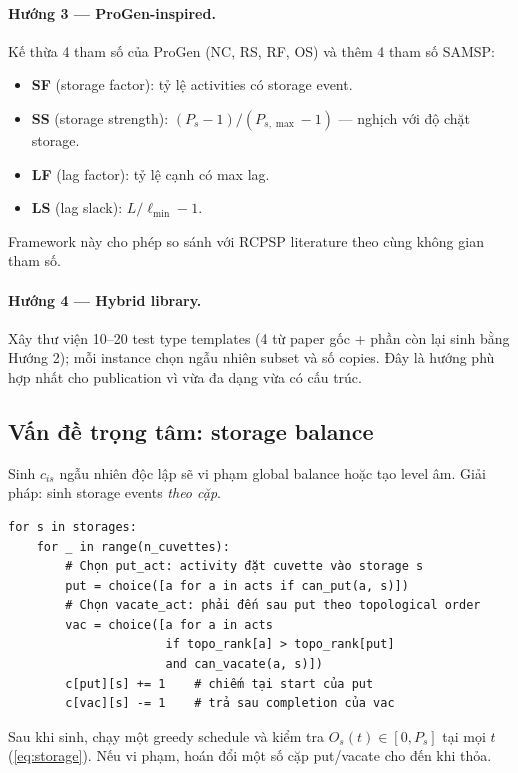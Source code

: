 \documentclass[11pt,a4paper]{article}
\theoremstyle{remark}
\begin{document}
\paragraph{Hướng 3 — ProGen-inspired.}
Kế thừa 4 tham số của ProGen (NC, RS, RF, OS) và thêm 4 tham số SAMSP:
\begin{itemize}[noitemsep]
  \item \textbf{SF} (storage factor): tỷ lệ activities có storage event.
  \item \textbf{SS} (storage strength): $(P_s - 1) / (P_{s,\max} - 1)$
    — nghịch với độ chặt storage.
  \item \textbf{LF} (lag factor): tỷ lệ cạnh có max lag.
  \item \textbf{LS} (lag slack): $L / \ell_{\min} - 1$.
\end{itemize}
Framework này cho phép so sánh với RCPSP literature theo cùng không gian tham số.

\paragraph{Hướng 4 — Hybrid library.}
Xây thư viện 10--20 test type templates (4 từ paper gốc + phần còn lại
sinh bằng Hướng 2); mỗi instance chọn ngẫu nhiên subset và số copies.
Đây là hướng phù hợp nhất cho publication vì vừa đa dạng vừa có cấu trúc.

\subsection{Vấn đề trọng tâm: storage balance}

Sinh $c_{is}$ ngẫu nhiên độc lập sẽ vi phạm global balance hoặc tạo level
âm. Giải pháp: sinh storage events \emph{theo cặp}.

\begin{verbatim}
for s in storages:
    for _ in range(n_cuvettes):
        # Chọn put_act: activity đặt cuvette vào storage s
        put = choice([a for a in acts if can_put(a, s)])
        # Chọn vacate_act: phải đến sau put theo topological order
        vac = choice([a for a in acts
                      if topo_rank[a] > topo_rank[put]
                      and can_vacate(a, s)])
        c[put][s] += 1    # chiếm tại start của put
        c[vac][s] -= 1    # trả sau completion của vac
\end{verbatim}

Sau khi sinh, chạy một greedy schedule và kiểm tra
$O_s(t) \in [0, P_s]$ tại mọi $t$ (\cref{eq:storage}).
Nếu vi phạm, hoán đổi một số cặp put/vacate cho đến khi thỏa.
\end{document}
